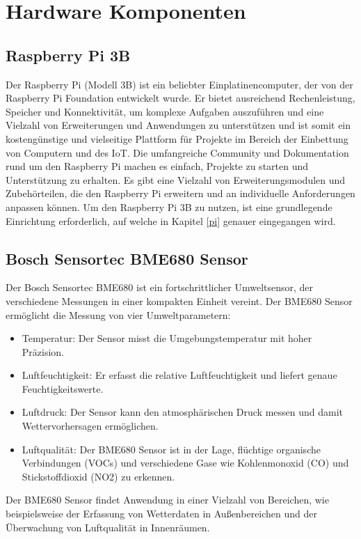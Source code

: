 \documentclass[conference]{IEEEtran}
\begin{document}
\section{Hardware Komponenten}
\subsection{Raspberry Pi 3B}
Der Raspberry Pi (Modell 3B) ist ein beliebter Einplatinencomputer, der von der Raspberry Pi Foundation entwickelt wurde. Er bietet ausreichend Rechenleistung, Speicher und Konnektivität, um komplexe Aufgaben auszuführen und eine Vielzahl von Erweiterungen und Anwendungen zu unterstützen und ist somit ein kostengünstige und vielseitige Plattform für Projekte im Bereich der Einbettung von Computern und des IoT. Die umfangreiche Community und Dokumentation rund um den Raspberry Pi machen es einfach, Projekte zu starten und Unterstützung zu erhalten. Es gibt eine Vielzahl von Erweiterungsmodulen und Zubehörteilen, die den Raspberry Pi erweitern und an individuelle Anforderungen anpassen können. Um den Raspberry Pi 3B zu nutzen, ist eine grundlegende Einrichtung erforderlich, auf welche in Kapitel \ref{pi} genauer eingegangen wird. \cite{raspy} 

\subsection{Bosch Sensortec BME680 Sensor}
Der Bosch Sensortec BME680 ist ein fortschrittlicher Umweltsensor, der verschiedene Messungen in einer kompakten Einheit vereint. Der BME680 Sensor ermöglicht die Messung von vier Umweltparametern:
\begin{itemize}
	\item Temperatur: Der Sensor misst die Umgebungstemperatur mit hoher Präzision.
	\item Luftfeuchtigkeit: Er erfasst die relative Luftfeuchtigkeit und liefert genaue Feuchtigkeitswerte.
	\item Luftdruck: Der Sensor kann den atmosphärischen Druck messen und damit Wettervorhersagen ermöglichen.
	\item Luftqualität: Der BME680 Sensor ist in der Lage, flüchtige organische Verbindungen (VOCs) und verschiedene Gase wie Kohlenmonoxid (CO) und Stickstoffdioxid (NO2) zu erkennen.
\end{itemize}
Der BME680 Sensor findet Anwendung in einer Vielzahl von Bereichen, wie beispielsweise der Erfassung von Wetterdaten in Außenbereichen und der Überwachung von Luftqualität in Innenräumen. \cite{bme}
\end{document}
